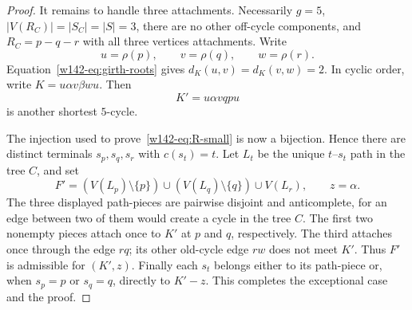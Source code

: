 \documentclass[10pt,a4paper]{amsart}
\begin{document}
\begin{proof}
It remains to handle three attachments.  Necessarily $g=5$,
$|V(R_C)|=|S_C|=|S|=3$, there are no other off-cycle components, and
$R_C=p-q-r$ with all three vertices attachments.  Write
\[
 u=\rho(p),\qquad v=\rho(q),\qquad w=\rho(r).
\]
Equation~\eqref{w142-eq:girth-roots} gives $d_K(u,v)=d_K(v,w)=2$.  In cyclic
order, write $K=u\alpha v\beta w u$.  Then
\[
  K'=u\alpha v q p u
\]
is another shortest $5$-cycle.

The injection used to prove~\eqref{w142-eq:R-small} is now a bijection.  Hence
there are distinct terminals $s_p,s_q,s_r$ with $c(s_t)=t$.  Let $L_t$ be
the unique $t$--$s_t$ path in the tree $C$, and set
\[
 F'=(V(L_p)\setminus\{p\})\cup
    (V(L_q)\setminus\{q\})\cup V(L_r),
 \qquad z=\alpha.
\]
The three displayed path-pieces are pairwise disjoint and anticomplete, for
an edge between two of them would create a cycle in the tree $C$.  The first
two nonempty pieces attach once to $K'$ at $p$ and $q$, respectively.  The
third attaches once through the edge $rq$; its other old-cycle edge $rw$
does not meet $K'$.  Thus $F'$ is admissible for $(K',z)$.  Finally each
$s_t$ belongs either to its path-piece or, when $s_p=p$ or $s_q=q$, directly
to $K'-z$.  This completes the exceptional case and the proof.
\end{proof}
\end{document}
